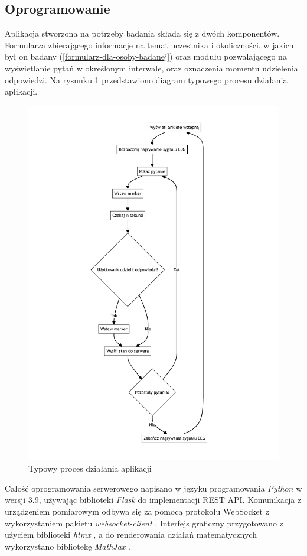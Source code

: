\documentclass{./assets/wfis}
\begin{document}
\subsection{Oprogramowanie}
Aplikacja stworzona na potrzeby badania składa się z dwóch komponentów. Formularza zbierającego informacje na temat uczestnika i okoliczności, w jakich był on badany (\autoref{formularz-dla-osoby-badanej}) oraz modułu pozwalającego na wyświetlanie pytań w określonym interwale, oraz oznaczenia momentu udzielenia odpowiedzi. Na rysunku \ref{fig:app-flow} przedstawiono diagram typowego procesu działania aplikacji.
\begin{figure}[h!]
    \centering
    \includegraphics[width=\columnwidth]{diagrams/app_flow.pdf}
    \caption{Typowy proces działania aplikacji}
    \label{fig:app-flow}
\end{figure}
Całość oprogramowania serwerowego napisano w języku programowania \textit{Python} \cite{python_developers_python_2024} w wersji 3.9, używając biblioteki \textit{Flask} \cite{flask_developers_flask_nodate} do implementacji REST API. Komunikacja z urządzeniem pomiarowym odbywa się za pomocą protokołu WebSocket z wykorzystaniem pakietu \textit{websocket-client} \cite{liris_websocket-client_nodate}. Interfejs graficzny przygotowano z użyciem biblioteki \textit{htmx} \cite{htmx_developers_htmx_nodate}, a do renderowania działań matematycznych wykorzystano bibliotekę \textit{MathJax} \cite{consortium_mathjax_nodate}.
\end{document}
